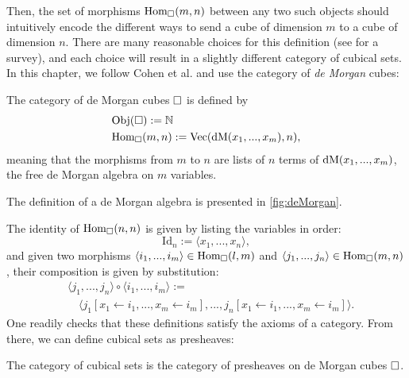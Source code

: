 Then, the set of morphisms \( \hom[\catCube]{m}{n} \) between any two such objects should 
intuitively encode the different ways to send a cube of dimension \( m \) to
a cube of dimension \( n \).
%  
There are many reasonable choices for this definition 
(see  for a survey), and each choice will 
result in a slightly different category of cubical sets. 
% 
In this chapter, we follow Cohen et al. \cite{CCHM} and use the category of 
\emph{de Morgan} cubes:
\begin{definition}\label{def:cat_cubes}
    The category of de Morgan cubes \( \catCube \) is defined by
    \begin{align*}
        & \obj{\catCube} := \Nat \\
        & \hom[\catCube]{m}{n} := \mathrm{Vec}(\demorgan{x_1, ..., x_m}, n),
    \end{align*}
    meaning that the morphisms from \( m \) to \( n \) are lists of \( n \) 
    terms of \( \demorgan{x_1, ..., x_m} \), the free de Morgan algebra on 
    \( m \) variables.
\end{definition}
% 
The definition of a de Morgan algebra is presented in \cref{fig:deMorgan}.

The identity of \( \hom[\catCube]{n}{n} \) is given by listing the variables
in order:
\[
    \mathrm{Id}_n := \langle x_1 , ... , x_n \rangle,
\]
and given two morphisms
\( \langle i_1 , ... , i_m \rangle \in \hom[\catCube]{l}{m} \)
and \( \langle j_1 , ... , j_n \rangle \in \hom[\catCube]{m}{n} \), their 
composition is given by substitution:
\begin{align*}
    & \langle j_1 , ... , j_n \rangle \circ \langle i_1 , ... , i_m \rangle := \\
    & \quad \langle j_1[x_1 \leftarrow i_1, ..., x_m \leftarrow i_m] , ... , j_n[x_1 \leftarrow i_1, ..., x_m \leftarrow i_m] \rangle.
\end{align*}
% 
One readily checks that these definitions satisfy the axioms of a category.
From there, we can define cubical sets as presheaves:
\begin{definition}
    The category of cubical sets is the category of presheaves on de Morgan cubes 
    \( \catCube \).
\end{definition}

